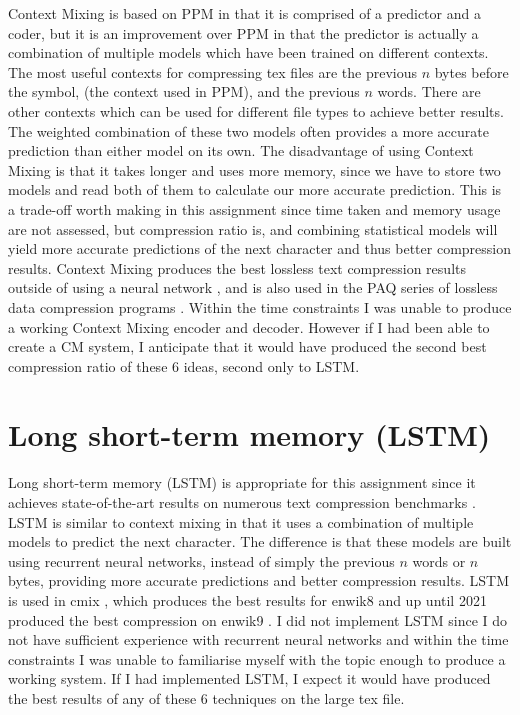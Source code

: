 \documentclass[a4paper, 11pt]{article}
\numberwithin{equation}{section}
\begin{document}
Context Mixing is based on PPM in that it is comprised of a predictor and a coder, but it is an improvement 
over PPM in that the predictor is actually a combination of multiple models which have been trained on 
different contexts. 
The most useful contexts for compressing tex files are the previous $n$ bytes before the symbol, 
(the context used in PPM), and the previous $n$ words. 
There are other contexts which can be used for different file types to achieve better results. 
The weighted combination of these two models often provides a more accurate prediction than either 
model on its own. 
The disadvantage of using Context Mixing is that it takes longer and uses more memory, since we have to 
store two models and read both of them to calculate our more accurate prediction. 
This is a trade-off worth making in this assignment since time taken and memory usage are not assessed, but 
compression ratio is, and combining statistical models will yield more accurate predictions of the next 
character and thus better compression results. 
Context Mixing produces the best lossless text compression results outside of using a neural network \cite{TextBenchmark}, 
and is also used in the PAQ series of lossless data compression programs \cite{TextCompression}. 
Within the time constraints I was unable to produce a working Context Mixing encoder and decoder. 
However if I had been able to create a CM system, I anticipate that it would have produced the second 
best compression ratio of these 6 ideas, second only to LSTM. 


\section{Long short-term memory (LSTM)}

Long short-term memory (LSTM) is appropriate for this assignment since it achieves state-of-the-art 
results on numerous text compression benchmarks \cite{cmix,TextBenchmark}. 
LSTM is similar to context mixing in that it uses a combination of multiple models to predict the next character. 
The difference is that these models are built using recurrent neural networks, instead of 
simply the previous $n$ words or $n$ bytes, providing more accurate predictions and better compression results. 
LSTM is used in cmix \cite{cmix}, which produces the best results for enwik8 and up until 2021 \cite{bellard2021lossless} 
produced the best compression on enwik9 \cite{TextBenchmark}. 
I did not implement LSTM since I do not have sufficient experience with recurrent neural networks and within 
the time constraints I was unable to familiarise myself with the topic enough to produce a working system. 
If I had implemented LSTM, I expect it would have produced the best results of any of these 6 techniques 
on the large tex file. 




\end{document}
